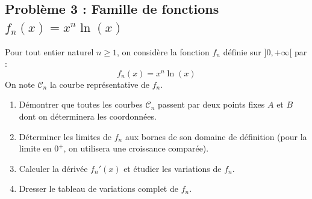 \subsection*{Problème 3 : Famille de fonctions $f_n(x) = x^n \ln(x)$}
Pour tout entier naturel $n \ge 1$, on considère la fonction $f_n$ définie sur $]0, +\infty[$ par :
\[
f_n(x) = x^n \ln(x)
\]
On note $\mathcal{C}_n$ la courbe représentative de $f_n$.
\begin{enumerate}
    \item Démontrer que toutes les courbes $\mathcal{C}_n$ passent par deux points fixes $A$ et $B$ dont on déterminera les coordonnées.
    \item Déterminer les limites de $f_n$ aux bornes de son domaine de définition (pour la limite en $0^+$, on utilisera une croissance comparée).
    \item Calculer la dérivée $f_n'(x)$ et étudier les variations de $f_n$.
    \item Dresser le tableau de variations complet de $f_n$.
\end{enumerate}

